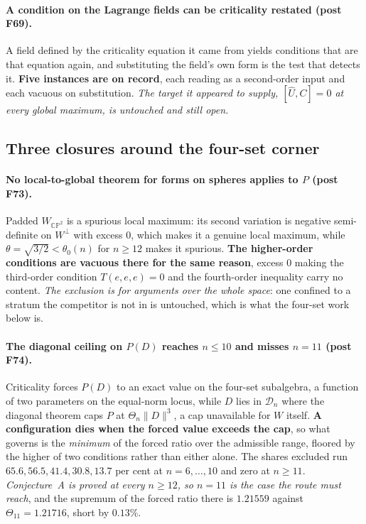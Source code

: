 \paragraph{A condition on the Lagrange fields can be criticality restated (post F69).} A field defined by the criticality equation it came from yields conditions that are that equation again, and substituting the field's own form is the test that detects it. \textbf{Five instances are on record}, each reading as a second-order input and each vacuous on substitution. \emph{The target it appeared to supply, $[\hat U,C]=0$ at every global maximum, is untouched and still open.}

\subsection{Three closures around the four-set corner}\label{sec:fourfences}

\paragraph{No local-to-global theorem for forms on spheres applies to $P$ (post F73).} Padded $W_{\mathbb{CP}^2}$ is a spurious local maximum: its second variation is negative semi-definite on $W^{\perp}$ with excess $0$, which makes it a genuine local maximum, while $\theta=\sqrt{3/2}<\theta_0(n)$ for $n\ge12$ makes it spurious. \textbf{The higher-order conditions are vacuous there for the same reason}, excess $0$ making the third-order condition $T(e,e,e)=0$ and the fourth-order inequality carry no content. \emph{The exclusion is for arguments over the whole space}: one confined to a stratum the competitor is not in is untouched, which is what the four-set work below is.

\paragraph{The diagonal ceiling on $P(D)$ reaches $n\le10$ and misses $n=11$ (post F74).} Criticality forces $P(D)$ to an exact value on the four-set subalgebra, a function of two parameters on the equal-norm locus, while $D$ lies in $\mathcal D_n$ where the diagonal theorem caps $P$ at $\Theta_n\|D\|^3$, a cap unavailable for $W$ itself. \textbf{A configuration dies when the forced value exceeds the cap}, so what governs is the \emph{minimum} of the forced ratio over the admissible range, floored by the higher of two conditions rather than either alone. The shares excluded run $65.6, 56.5, 41.4, 30.8, 13.7$ per cent at $n=6,\dots,10$ and zero at $n\ge11$. \emph{Conjecture~A is proved at every $n\ge12$, so $n=11$ is the case the route must reach}, and the supremum of the forced ratio there is $1.21559$ against $\Theta_{11}=1.21716$, short by $0.13\%$.

